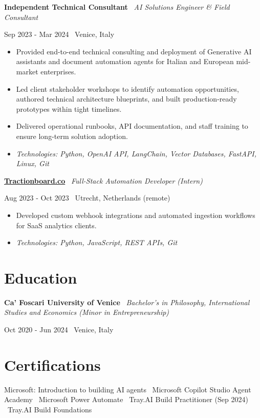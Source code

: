 \documentclass[a4paper,10pt]{article}
\newcommand{\role}[4]{%
  \vspace{2pt}\noindent
  \begin{minipage}[t]{0.70\textwidth}\raggedright\textbf{#1} \textbullet\ \textit{#3}\end{minipage}%
  \hfill
  \begin{minipage}[t]{0.28\textwidth}\raggedleft\footnotesize\color{gray}#2 \textbullet\ #4\end{minipage}%
  \vspace{1pt}%
}
\begin{document}
\role{Independent Technical Consultant}{Sep 2023 - Mar 2024}{AI Solutions Engineer \& Field Consultant}{Venice, Italy}
\begin{itemize}
  \item Provided end-to-end technical consulting and deployment of Generative AI assistants and document automation agents for Italian and European mid-market enterprises.
  \item Led client stakeholder workshops to identify automation opportunities, authored technical architecture blueprints, and built production-ready prototypes within tight timelines.
  \item Delivered operational runbooks, API documentation, and staff training to ensure long-term solution adoption.
  \item \textit{Technologies: Python, OpenAI API, LangChain, Vector Databases, FastAPI, Linux, Git}
\end{itemize}

\role{\href{https://tractionboard.co}{Tractionboard.co}}{Aug 2023 - Oct 2023}{Full-Stack Automation Developer (Intern)}{Utrecht, Netherlands (remote)}
\begin{itemize}
  \item Developed custom webhook integrations and automated ingestion workflows for SaaS analytics clients.
  \item \textit{Technologies: Python, JavaScript, REST APIs, Git}
\end{itemize}

\section{Education}
\role{Ca' Foscari University of Venice}{Oct 2020 - Jun 2024}{Bachelor's in Philosophy, International Studies and Economics (Minor in Entrepreneurship)}{Venice, Italy}

\section{Certifications}
Microsoft: Introduction to building AI agents \textbullet\ Microsoft Copilot Studio Agent Academy \textbullet\ Microsoft Power Automate \textbullet\ Tray.AI Build Practitioner (Sep 2024) \textbullet\ Tray.AI Build Foundations

\end{document}
